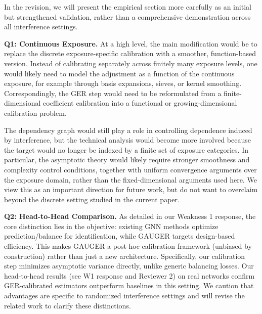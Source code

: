 \documentclass{article}
\theoremstyle{plain}
\theoremstyle{definition}
\theoremstyle{remark}
\begin{document}
In the revision, we will present the empirical section more carefully as an initial but strengthened validation, rather than a comprehensive demonstration across all interference settings.

\vspace{0.5em}
\noindent\textbf{Q1: Continuous Exposure.}
At a high level, the main modification would be to replace the discrete exposure-specific calibration with a smoother, function-based version. Instead of calibrating separately across finitely many exposure levels, one would likely need to model the adjustment as a function of the continuous exposure, for example through basis expansions, sieves, or kernel smoothing. Correspondingly, the GER step would need to be reformulated from a finite-dimensional coefficient calibration into a functional or growing-dimensional calibration problem.

The dependency graph would still play a role in controlling dependence induced by interference, but the technical analysis would become more involved because the target would no longer be indexed by a finite set of exposure categories. In particular, the asymptotic theory would likely require stronger smoothness and complexity control conditions, together with uniform convergence arguments over the exposure domain, rather than the fixed-dimensional arguments used here. We view this as an important direction for future work, but do not want to overclaim beyond the discrete setting studied in the current paper.


\vspace{0.5em}
\noindent\textbf{Q2: Head-to-Head Comparison.} As detailed in our Weakness 1 response, the core distinction lies in the objective: existing GNN methods optimize prediction/balance for identification, while GAUGER targets design-based efficiency. This makes GAUGER a post-hoc calibration framework (unbiased by construction) rather than just a new architecture. Specifically, our calibration step minimizes asymptotic variance directly, unlike generic balancing losses. Our head-to-head results (see W1 response and Reviewer 2) on real networks confirm GER-calibrated estimators outperform baselines in this setting. We caution that advantages are specific to randomized interference settings and will revise the related work to clarify these distinctions.


\end{document}
